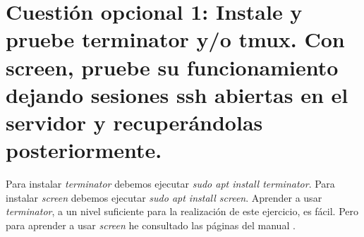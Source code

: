\documentclass[a4paper,titlepage,12pt]{scrartcl}	%
\numberwithin{figure}{section} %
\numberwithin{table}{section} %
\begin{document}
	\clearpage
	
	\section[Cuestión opcional 1: Instale y pruebe terminator y/o tmux. Con screen, pruebe su funcionamiento dejando sesiones ssh abiertas en el servidor y recuperándolas posteriormente.]{Cuestión opcional 1: Instale y pruebe terminator y/o tmux. Con screen, pruebe su funcionamiento dejando sesiones ssh abiertas en el servidor y recuperándolas posteriormente.}
	
	Para instalar \textit{terminator} debemos ejecutar \textit{sudo apt install terminator}. Para instalar \textit{screen} debemos ejecutar \textit{sudo apt install screen}. Aprender a usar \textit{terminator}, a un nivel suficiente para la realización de este ejercicio, es fácil. Pero para aprender a usar \textit{screen} he consultado las páginas del manual \cite{screen}. \\
	
\end{document}
